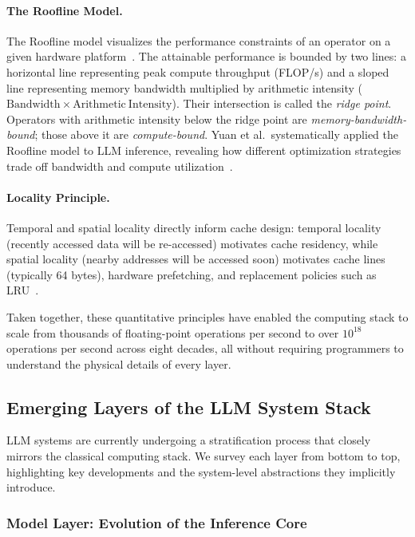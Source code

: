 \paragraph{The Roofline Model.}
The Roofline model visualizes the performance constraints of an operator on a given hardware platform~\cite{hennessy2017quantitative}.
The attainable performance is bounded by two lines: a horizontal line representing peak compute throughput (FLOP/s) and a sloped line representing memory bandwidth multiplied by arithmetic intensity ($\mathrm{Bandwidth} \times \mathrm{Arithmetic\ Intensity}$).
Their intersection is called the \emph{ridge point}.
Operators with arithmetic intensity below the ridge point are \emph{memory-bandwidth-bound}; those above it are \emph{compute-bound}.
Yuan et al.\ systematically applied the Roofline model to LLM inference, revealing how different optimization strategies trade off bandwidth and compute utilization~\cite{yuan2024llminference}.

\paragraph{Locality Principle.}
Temporal and spatial locality directly inform cache design: temporal locality (recently accessed data will be re-accessed) motivates cache residency, while spatial locality (nearby addresses will be accessed soon) motivates cache lines (typically 64 bytes), hardware prefetching, and replacement policies such as LRU~\cite{drepper2007memory}.

Taken together, these quantitative principles have enabled the computing stack to scale from thousands of floating-point operations per second to over $10^{18}$ operations per second across eight decades, all without requiring programmers to understand the physical details of every layer.

\subsection{Emerging Layers of the LLM System Stack}

LLM systems are currently undergoing a stratification process that closely mirrors the classical computing stack.
We survey each layer from bottom to top, highlighting key developments and the system-level abstractions they implicitly introduce.

\subsubsection{Model Layer: Evolution of the Inference Core}

